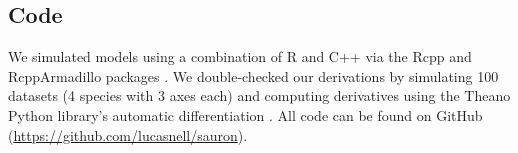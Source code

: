 







\subsection*{Code}

We simulated models using a combination of R \citep{RCoreTeam2020} and
C++ via the Rcpp and RcppArmadillo packages
\citep{Eddelbuettel2014a,Eddelbuettel2013a,Sanderson2016}.
We double-checked our derivations by simulating 100 datasets
(4 species with 3 axes each) and computing derivatives using the Theano Python
library's automatic differentiation \citep{TheanoTeam2016a}.
All code can be found on GitHub
(\url{https://github.com/lucasnell/sauron}).

